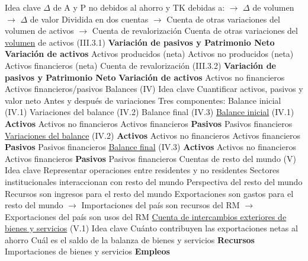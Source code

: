 \documentclass{nuevotema}
\begin{document}
\begin{esquemal}
				\4 Idea clave
				\4[] $\Delta$ de A y P no debidos al ahorro y TK debidas a:
				\4[] $\to$ $\Delta$ de volumen
				\4[] $\to$ $\Delta$ de valor
				\4[] Dividida en dos cuentas
				\4[] $\to$ Cuenta de otras variaciones del volumen de activos
				\4[] $\to$ Cuenta de revalorización
			\3 Cuenta de otras variaciones del \underline{volumen} de activos (III.3.1)
				\4 \textbf{Variación de pasivos y Patrimonio Neto}
				\4 \textbf{Variación de activos}
				\4[] Activos producidos (neta)
				\4[] Activos no producidos (neta)
				\4[] Activos financieros (neta)
				\4[] 
			\3 Cuenta de revalorización (III.3.2)
				\4 \textbf{Variación de pasivos y Patrimonio Neto}
				\4 \textbf{Variación de activos}
				\4[] Activos no financieros
				\4[] Activos financieros/pasivos
				\4[] 
		\2 Balances (IV)
			\3 Idea clave
				\4 Cuantificar activos, pasivos y valor neto
				\4[] Antes y después de variaciones
				\4 Tres componentes:
				\4[] Balance inicial (IV.1)
				\4[] Variaciones del balance (IV.2)
				\4[] Balance final (IV.3)
			\3 \underline{Balance inicial} (IV.1)
				\4 \textbf{Activos}
				\4[] Activos no financieros
				\4[] Activos financieros
				\4 \textbf{Pasivos}
				\4[] Pasivos financieros
				\4[] 
			\3 \underline{Variaciones del balance} (IV.2)
				\4 \textbf{Activos}
				\4[] Activos no financieros
				\4[] Activos financieros
				\4 \textbf{Pasivos}
				\4[] Pasivos financieros
				\4[] 
			\3 \underline{Balance final} (IV.3)
				\4 \textbf{Activos}
				\4[] Activos no financieros
				\4[] Activos financieros
				\4 \textbf{Pasivos}
				\4[] Pasivos financieros
				\4[] 
		\2 Cuentas de resto del mundo (V)
			\3 Idea clave
				\4 Representar operaciones entre residentes y no residentes
				\4[] Sectores institucionales interaccionan con resto del mundo
				\4 Perspectiva del resto del mundo
				\4[] Recursos son ingresos para el resto del mundo
				\4[] Exportaciones son gastos para el resto del mundo
				\4[] $\to$ Importaciones del país son recursos del RM
				\4[] $\to$ Exportaciones del país son usos del RM
			\3 \underline{Cuenta de intercambios exteriores de bienes y servicios} (V.1)
				\4 Idea clave
				\4[] Cuánto contribuyen las exportaciones netas al ahorro
				\4[] Cuál es el saldo de la balanza de bienes y servicios
				\4 \textbf{Recursos}
				\4[] Importaciones de bienes y servicios
				\4 \textbf{Empleos}

\end{esquemal}
\end{document}
